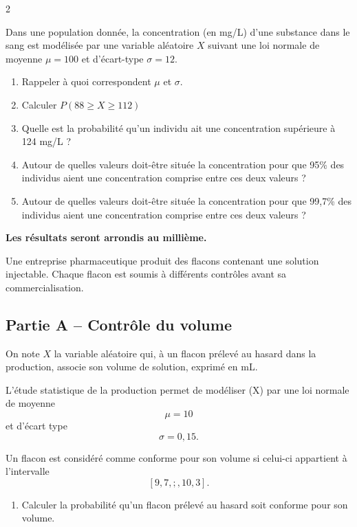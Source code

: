 \documentclass[10pt,a4paper]{article}
\begin{document}
\begin{multicols}{2}
\begin{exo}[][]
    Dans une population donnée, la concentration (en mg/L) d'une substance dans le sang est modélisée par une variable aléatoire \(X\) suivant une loi normale de moyenne \(\mu = 100\) et d'écart-type \(\sigma = 12\).
    \begin{enumerate}
        \item Rappeler à quoi correspondent \(\mu\) et \(\sigma\).
        \item Calculer \(P(88\geq X\geq 112)\)
        \item Quelle est la probabilité qu'un individu ait une concentration supérieure à 124 mg/L ?
        \item Autour de quelles valeurs doit-être située la concentration pour que 95\% des individus aient une concentration comprise entre ces deux valeurs ?
        \item Autour de quelles valeurs doit-être située la concentration pour que 99,7\% des individus aient une concentration comprise entre ces deux valeurs ?
    \end{enumerate}
\end{exo}


\begin{exo}[][ccf]

\textbf{Les résultats seront arrondis au millième.}

Une entreprise pharmaceutique produit des flacons contenant une solution injectable. Chaque flacon est soumis à différents contrôles avant sa commercialisation.

\subsection*{Partie A -- Contrôle du volume}

On note \(X\) la variable aléatoire qui, à un flacon prélevé au hasard dans la production, associe son volume de solution, exprimé en mL.

L'étude statistique de la production permet de modéliser (X) par une loi normale de moyenne
\[
\mu=10
\]
et d'écart type
\[
\sigma=0,15.
\]

Un flacon est considéré comme conforme pour son volume si celui-ci appartient à l'intervalle
\[
[9,7,;,10,3].
\]

\begin{enumerate}
\item Calculer la probabilité qu'un flacon prélevé au hasard soit conforme pour son volume.


\end{enumerate}
\end{exo}
\end{multicols}
\end{document}

